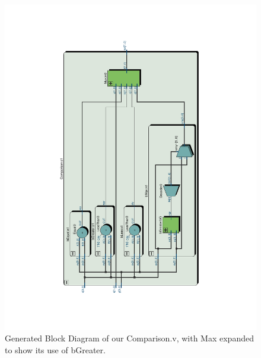 \documentclass[11pt]{article}
\begin{document}
\begin{figure}[H]
    \centering
        \includegraphics[clip, trim=4cm 3cm 5cm 3cm, angle=270,  width=\textwidth]{Comparison}
        \caption{Generated Block Diagram of our Comparison.v, with Max expanded to show its use of bGreater.}
    \label{fig:comparisongen}
\end{figure}
\end{document}
